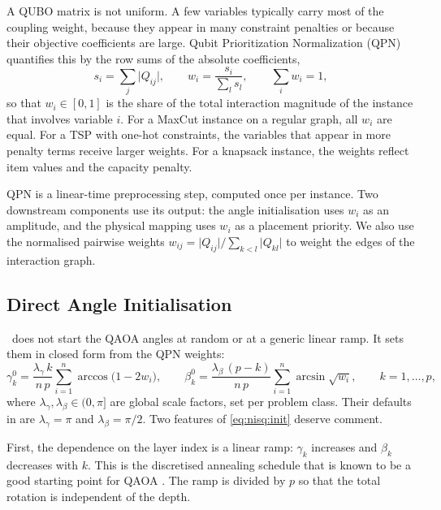 A QUBO matrix is not uniform. A few variables typically carry most of the coupling weight, because they appear in many constraint penalties or because their objective coefficients are large. Qubit Prioritization Normalization (QPN) quantifies this by the row sums of the absolute coefficients,
\begin{equation}\label{eq:nisq:qpn}
  s_{i} = \sum_{j} \lvert Q_{ij}\rvert, \qquad w_{i} = \frac{s_{i}}{\sum_{l} s_{l}}, \qquad \sum_{i} w_{i} = 1,
\end{equation}
so that $w_{i}\in[0,1]$ is the share of the total interaction magnitude of the instance that involves variable $i$. For a MaxCut instance on a regular graph, all $w_{i}$ are equal. For a TSP with one-hot constraints, the variables that appear in more penalty terms receive larger weights. For a knapsack instance, the weights reflect item values and the capacity penalty.

QPN is a linear-time preprocessing step, computed once per instance. Two downstream components use its output: the angle initialisation uses $w_{i}$ as an amplitude, and the physical mapping uses $w_{i}$ as a placement priority. We also use the normalised pairwise weights $w_{ij}=\lvert Q_{ij}\rvert/\sum_{k<l}\lvert Q_{kl}\rvert$ to weight the edges of the interaction graph.

\subsection{Direct Angle Initialisation}\label{sec:nisq:init}

\deal\ does not start the QAOA angles at random or at a generic linear ramp. It sets them in closed form from the QPN weights:
\begin{equation}\label{eq:nisq:init}
  \gamma_{k}^{0} = \frac{\lambda_{\gamma}\, k}{n\,p}\sum_{i=1}^{n} \arccos\bigl(1-2w_{i}\bigr),
  \qquad
  \beta_{k}^{0} = \frac{\lambda_{\beta}\,(p-k)}{n\,p}\sum_{i=1}^{n} \arcsin\sqrt{w_{i}},
  \qquad k=1,\dots,p,
\end{equation}
where $\lambda_{\gamma},\lambda_{\beta}\in(0,\pi]$ are global scale factors, set per problem class. Their defaults in \cite{guo2025deal} are $\lambda_{\gamma}=\pi$ and $\lambda_{\beta}=\pi/2$. Two features of \cref{eq:nisq:init} deserve comment.

First, the dependence on the layer index is a linear ramp: $\gamma_{k}$ increases and $\beta_{k}$ decreases with $k$. This is the discretised annealing schedule that is known to be a good starting point for QAOA \cite{weidenfeller2022qaoascaling,sachdeva2024qaoa127}. The ramp is divided by $p$ so that the total rotation is independent of the depth.

